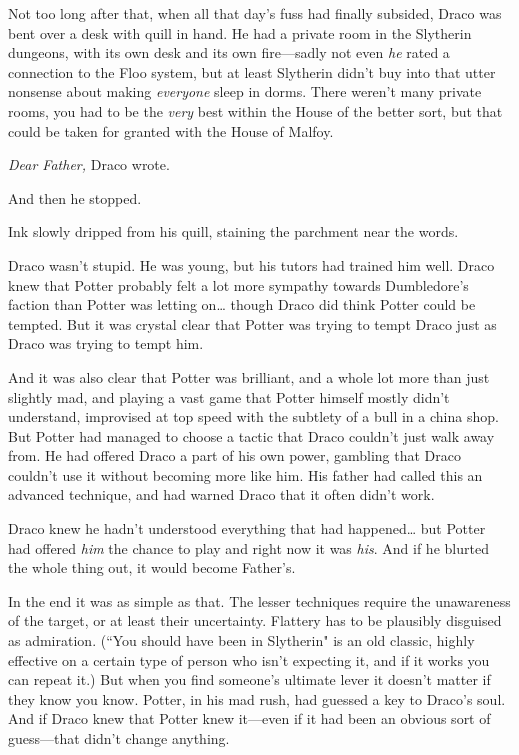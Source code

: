 
Not too long after that, when all that day's fuss had finally subsided, Draco was bent over a desk with quill in hand. He had a private room in the Slytherin dungeons, with its own desk and its own fire—sadly not even \emph{he} rated a connection to the Floo system, but at least Slytherin didn't buy into that utter nonsense about making \emph{everyone} sleep in dorms. There weren't many private rooms, you had to be the \emph{very} best within the House of the better sort, but that could be taken for granted with the House of Malfoy.

\emph{Dear Father,} Draco wrote.

And then he stopped.

Ink slowly dripped from his quill, staining the parchment near the words.

Draco wasn't stupid. He was young, but his tutors had trained him well. Draco knew that Potter probably felt a lot more sympathy towards Dumbledore's faction than Potter was letting on{\ldots} though Draco did think Potter could be tempted. But it was crystal clear that Potter was trying to tempt Draco just as Draco was trying to tempt him.

And it was also clear that Potter was brilliant, and a whole lot more than just slightly mad, and playing a vast game that Potter himself mostly didn't understand, improvised at top speed with the subtlety of a bull in a china shop. But Potter had managed to choose a tactic that Draco couldn't just walk away from. He had offered Draco a part of his own power, gambling that Draco couldn't use it without becoming more like him. His father had called this an advanced technique, and had warned Draco that it often didn't work.

Draco knew he hadn't understood everything that had happened{\ldots} but Potter had offered \emph{him} the chance to play and right now it was \emph{his}. And if he blurted the whole thing out, it would become Father's.

In the end it was as simple as that. The lesser techniques require the unawareness of the target, or at least their uncertainty. Flattery has to be plausibly disguised as admiration. (``You should have been in Slytherin" is an old classic, highly effective on a certain type of person who isn't expecting it, and if it works you can repeat it.) But when you find someone's ultimate lever it doesn't matter if they know you know. Potter, in his mad rush, had guessed a key to Draco's soul. And if Draco knew that Potter knew it—even if it had been an obvious sort of guess—that didn't change anything.

